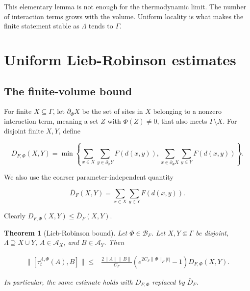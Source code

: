 \documentclass[12pt]{article}
\newtheorem{theorem}{Theorem}[section]
\theoremstyle{definition}
\theoremstyle{remark}
\newcommand{\Alg}{\mathcal A}
\begin{document}
This elementary lemma is not enough for the thermodynamic limit.  The number
of interaction terms grows with the volume.  Uniform locality is what makes
the finite statement stable as $\Lambda$ tends to $\Gamma$.

\section{Uniform Lieb-Robinson estimates}

\subsection{The finite-volume bound}

For finite $X\subseteq\Gamma$, let $\partial_{\Phi}X$ be the set of sites in
$X$ belonging to a nonzero interaction term, meaning a set $Z$ with
$\Phi(Z)\ne0$, that also meets $\Gamma\setminus X$.
For disjoint finite $X,Y$, define

\begin{equation}
  D_{F,\Phi}(X,Y)
  =\min\left\{
  \sum_{x\in X}\sum_{y\in\partial_\Phi Y}F(d(x,y)),
  \sum_{x\in\partial_\Phi X}\sum_{y\in Y}F(d(x,y))
  \right\}.
\end{equation}

We also use the coarser parameter-independent quantity

\begin{equation}
  \overline D_F(X,Y)
  =\sum_{x\in X}\sum_{y\in Y}F(d(x,y)).
  \label{eq:Dbar}
\end{equation}

Clearly $D_{F,\Phi}(X,Y)\le\overline D_F(X,Y)$.

\begin{theorem}[Lieb-Robinson bound]
\label{thm:LR-single}
Let $\Phi\in\mathcal B_F$.  Let $X,Y\Subset\Gamma$ be disjoint,
$\Lambda\supseteq X\cup Y$, $A\in\Alg_X$, and $B\in\Alg_Y$.  Then

\begin{equation}
\begin{split}
 \|[\tau_t^{\Lambda,\Phi}(A),B]\|
 \le {}&
 \frac{2\|A\|\|B\|}{C_F}
 \left(e^{2C_F\|\Phi\|_F|t|}-1\right)
 D_{F,\Phi}(X,Y).
 \label{eq:LR-single}
\end{split}
\end{equation}

In particular, the same estimate holds with $D_{F,\Phi}$ replaced by
$\overline D_F$.
\end{theorem}
\end{document}

